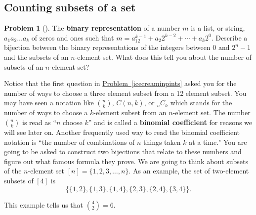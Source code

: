 \documentclass[10pt,]{book}
\newcommand{\terminology}[1]{\textbf{#1}}
\theoremstyle{plain}
\theoremstyle{definition}
\newtheorem{activity}[project]{Problem}
\theoremstyle{definition}
\numberwithin{equation}{chapter}
\begin{document}
\subsection[{Counting subsets of a set}]{Counting subsets of a set}\label{subsection-4}
\begin{activity}[]\marginsymbol[-1em]{} \label{SubsetsBinaryRepresentation}
The \terminology{binary representation} of a number \(m\) is a list, or string, \(a_1a_2\ldots a_k\) of zeros and ones such that \(m=a_12^{k-1} + a_2 2^{k-2}
+\cdots+ a_k 2^0.\) Describe a bijection between the binary representations of the integers between 0 and \(2^n-1\) and the subsets of an \(n\)-element set. What does this tell you about the number of subsets of an \(n\)-element set?%
\end{activity}
Notice that the first question in \hyperref[icecreaminpints]{Problem~\ref{icecreaminpints}} asked you for the number of ways to choose a three element subset from a 12 element subset. You may have seen a notation like \(\binom{n}{k}\), \(C(n,k)\), or \(_nC_k\) which stands for the number of ways to choose a \(k\)-element subset from an \(n\)-element set. The number \(\binom{n}{k}\) is read as ``\(n\) choose \(k\)'' and is called a \terminology{binomial coefficient} for reasons we will see later on. Another frequently used way to read the binomial coefficient notation is ``the number of combinations  of \(n\) things taken \(k\) at a time." You are going to be asked to construct two bijections that relate to these numbers and figure out what famous formula they prove. We are going to think about subsets of the \(n\)-element set \([n] =
\{1,2,3,\ldots, n\}\). As an example, the set of two-element subsets of \([4]\) is%
\begin{equation*}
\{\{1,2\}, \{1,3\}, \{1,4\}, \{2,3\}, \{2,4\}, \{3,4\}\}.
\end{equation*}
%
\par
This example tells us that \(\binom{4}{2} = 6\).%
\end{document}
